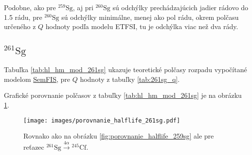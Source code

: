 \documentclass[12pt, oneside]{book}
\begin{document}
Podobne, ako pre $^{259} \mathrm{Sg}$, aj pri $^{260} \mathrm{Sg}$ sú odchýlky prechádzajúcich jadier rádovo do 1.5 rádu, pre $^{260} \mathrm{Sg}$ sú odchýlky minimálne, menej ako pol rádu, okrem polčasu určeného z $Q$ hodnoty podľa modelu ETFSI, tu je odchýlka viac než dva rády.

\subsection*{$^{261} \mathrm{Sg}$} 
\vspace{5mm}
Tabuľka  \ref{tab:hl_hm_mod_261sg} ukazuje teoretické polčasy rozpadu vypočítané modelom  \hyperref[sec:semfis]{SemFIS}, pre $Q$ hodnoty z tabuľky \ref{tab:261sg_q}.

\begin{table}[h!]
	\centering
	\caption{Porovnanie teoretických polčasov rozpadu reťazca $^{261} \mathrm{Sg} \xrightarrow{4 \alpha} {^{245} \mathrm{Cf}}$, určených podľa modelu z \cite{poe80} (upraveným v \cite{poe06}), pre $Q$ hodnoty určené z teoretických hmotnostných modelov podľa \ref{eq:q_ubytok}.}
	\label{tab:hl_hm_mod_261sg}
\end{table}

Grafické porovnanie polčasov z tabuľky \ref{tab:hl_hm_mod_261sg} je na obrázku \ref{fig:porovnanie_halflife_261sg}.

\begin{figure}[h!]
	\begin{center}
	\texttt{[image: images/porovnanie\_halflife\_261sg.pdf]}
	\caption{Rovnako ako na obrázku \ref{fig:porovnanie_halflife_259sg} ale pre reťazec $^{261} \mathrm{Sg} \xrightarrow{4 \alpha} {^{245} \mathrm{Cf}}$.}
	\label{fig:porovnanie_halflife_261sg}
    \end{center}
\end{figure}
\end{document}
